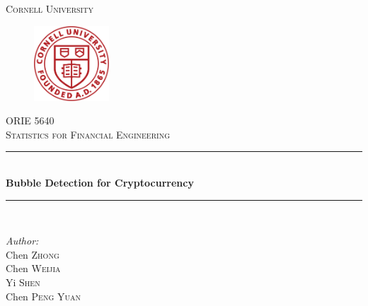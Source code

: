 \begin{titlepage}

\newcommand{\HRule}{\rule{\linewidth}{0.5mm}} %

\center %
 

\textsc{\LARGE Cornell University}\\[1.5cm] %
\begin{figure}
  \centering
  \includegraphics[width=0.25\textwidth]{cornell.png}
\end{figure}

\textsc{\Large ORIE 5640}\\[0.5cm] %
\textsc{\large Statistics for Financial Engineering}\\[0.5cm] %


\HRule \\[0.4cm]
{ \huge \bfseries Bubble Detection for Cryptocurrency }\\[0.4cm] %
\HRule \\[1.5cm]
 

\begin{minipage}{0.4\textwidth}
\begin{flushleft} \large
\emph{Author:}\\
Chen \textsc{Zhong} \\
Chen \textsc{Weijia} \\
Yi \textsc{Shen} \\
Chen \textsc{Peng Yuan} \\


\end{flushleft}
\end{minipage}
\end{titlepage}
